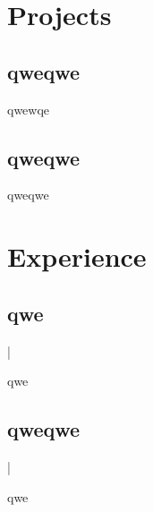 \documentclass[]{deedy-resume-openfont}
\begin{document}
	\hfill
	\begin{minipage}[t]{0.66\textwidth}
		\section{Projects}
		\begin{projects}
			\subsection*{qweqwe}   \vspace{\topsep} \begin{tightemize}\item qwewqe\end{tightemize}\subsection*{qweqwe}   \vspace{\topsep} \begin{tightemize}\item qweqwe\end{tightemize}
		\end{projects}
		\sectionsep

	\end{minipage}

	\begin{minipage}[t]{1\textwidth}
		\section{Experience}
		\begin{experience}
			\subsection*{qwe} \medspace|\medspace {}  \vspace{\topsep} \begin{tightemize}\item qwe\end{tightemize}\subsection*{qweqwe} \medspace|\medspace {}  \vspace{\topsep} \begin{tightemize}\item qwe\end{tightemize}
		\end{experience}
		\sectionsep
	\end{minipage}
\end{document}
